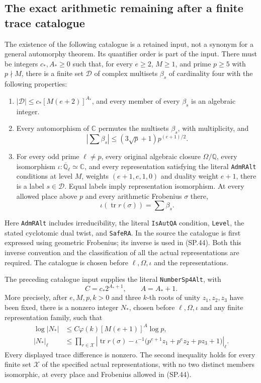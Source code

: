 \subsection{The exact arithmetic remaining after a finite trace catalogue}

The existence of the following catalogue is a retained input, not a
synonym for a general automorphy theorem.  Its quantifier order is
part of the input.  There must be integers $c_*,A_*\ge0$ such that,
for every $e\ge2$, $M\ge1$, and prime $p\ge5$ with $p\nmid M$,
there is a finite set $\mathcal D$ of complex multisets
$\beta_s$ of cardinality four with the following properties:
\begin{enumerate}
\item $|\mathcal D|\le c_*[M(e+2)]^{A_*}$, and every member of every
$\beta_s$ is an algebraic integer.
\item Every automorphism of $\mathbb C$ permutes the multisets
$\beta_s$, with multiplicity, and
\[
 \left|\sum\beta_s\right|
       \le (3\sqrt p+1)p^{(e+1)/2}.
 \tag{SP.43}
\]
\item For every odd prime $\ell\ne p$, every original algebraic
closure $\Omega/\mathbb Q$, every isomorphism
$\iota:\overline{\mathbb Q}_\ell\simeq\mathbb C$, and every
representation satisfying the literal \texttt{AdmRAlt} conditions
at level $M$, weights $(e+1,e,1,0)$ and duality weight $e+1$, there
is a label $s\in\mathcal D$.  Equal labels imply representation
isomorphism.  At every allowed place above $p$ and every arithmetic
Frobenius $\sigma$ there,
\[
                  \iota(\operatorname{tr}r(\sigma))=\sum\beta_s.
 \tag{SP.44}
\]
\end{enumerate}
Here \texttt{AdmRAlt} includes irreducibility, the literal
\texttt{IsAutQA} condition, \texttt{Level}, the stated cyclotomic
dual twist, and \texttt{SafeRA}.  In the source the catalogue is
first expressed using geometric Frobenius; its inverse is used in
(SP.44).  Both this inverse convention and the classification of
all the actual representations are required.  The catalogue is
chosen before $\ell,\Omega,\iota$ and the representations.

\begin{proposition}
\label{claim:SP9}
The preceding catalogue input supplies the literal
\texttt{NumberSp4Alt}, with
\[
                    C=c_*2^{A_*+1},\qquad A=A_*+1.
 \tag{SP.45}
\]
More precisely, after $e,M,p,k>0$ and three $k$-th roots of unity
$z_1,z_2,z_3$ have been fixed, there is a nonzero integer $N_*$,
chosen before $\ell,\Omega,\iota$ and any finite representation
family, such that
\[
 \begin{aligned}
 \log|N_*|&\le C\varphi(k)[M(e+1)]^A\log p,\\
 |N_*|_\ell&\le
 \prod_{r\in\mathcal X}
 \left|\operatorname{tr}r(\sigma)
       -\iota^{-1}\bigl(p^{e+1}z_1+p^ez_2+pz_3+1\bigr)\right|_\ell.
 \end{aligned}
 \tag{SP.46}
\]
Every displayed trace difference is nonzero.  The second inequality
holds for every finite set $\mathcal X$ of the specified actual
representations, with no two distinct members isomorphic, at every
place and Frobenius allowed in (SP.44).
\end{proposition}

